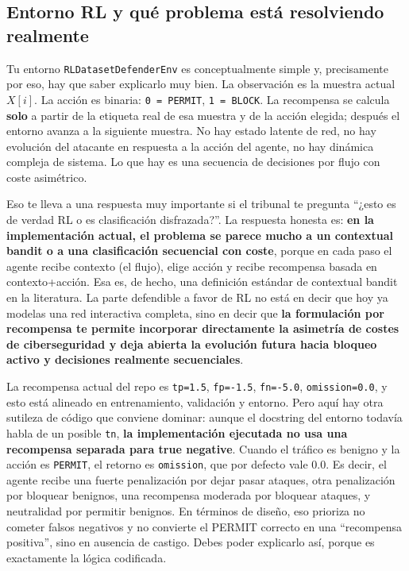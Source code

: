 ﻿\documentclass[12pt,a4paper]{article}
\begin{document}
\subsection{Entorno RL y qué problema está resolviendo realmente}

Tu entorno \texttt{RLDatasetDefenderEnv} es conceptualmente simple y, precisamente por eso, hay que
saber explicarlo muy bien. La observación es la muestra actual \(X[i]\). La acción es binaria:
\texttt{0 = PERMIT}, \texttt{1 = BLOCK}. La recompensa se calcula \textbf{solo} a partir de la
etiqueta real de esa muestra y de la acción elegida; después el entorno avanza a la siguiente
muestra. No hay estado latente de red, no hay evolución del atacante en respuesta a la acción del
agente, no hay dinámica compleja de sistema. Lo que hay es una secuencia de decisiones por flujo con
coste asimétrico.

Eso te lleva a una respuesta muy importante si el tribunal te pregunta ``¿esto es de verdad RL o es
clasificación disfrazada?''. La respuesta honesta es: \textbf{en la implementación actual, el
problema se parece mucho a un contextual bandit o a una clasificación secuencial con coste}, porque
en cada paso el agente recibe contexto (el flujo), elige acción y recibe recompensa basada en
contexto+acción. Esa es, de hecho, una definición estándar de contextual bandit en la literatura. La
parte defendible a favor de RL no está en decir que hoy ya modelas una red interactiva completa,
sino en decir que \textbf{la formulación por recompensa te permite incorporar directamente la
asimetría de costes de ciberseguridad y deja abierta la evolución futura hacia bloqueo activo y
decisiones realmente secuenciales}.

La recompensa actual del repo es \texttt{tp=1.5}, \texttt{fp=-1.5}, \texttt{fn=-5.0},
\texttt{omission=0.0}, y esto está alineado en entrenamiento, validación y entorno. Pero aquí hay
otra sutileza de código que conviene dominar: aunque el docstring del entorno todavía habla de un
posible \texttt{tn}, \textbf{la implementación ejecutada no usa una recompensa separada para true
negative}. Cuando el tráfico es benigno y la acción es \texttt{PERMIT}, el retorno es
\texttt{omission}, que por defecto vale 0.0. Es decir, el agente recibe una fuerte penalización por
dejar pasar ataques, otra penalización por bloquear benignos, una recompensa moderada por bloquear
ataques, y neutralidad por permitir benignos. En términos de diseño, eso prioriza no cometer falsos
negativos y no convierte el PERMIT correcto en una ``recompensa positiva'', sino en ausencia de
castigo. Debes poder explicarlo así, porque es exactamente la lógica codificada.
\end{document}
